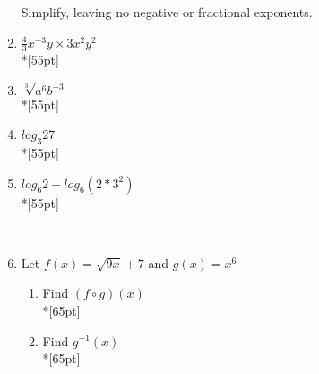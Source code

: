 \documentclass[]{book}
\begin{document}
\begin{enumerate}
\begin{figure}[!htbp]
\begin{center}
\begin{tikzpicture}[xscale= 0.2, yscale=0.015]
\end{tikzpicture}
\end{center}
\end{figure}

\newpage


Simplify, leaving no negative or fractional exponents.



\item $\frac{4}{3}x^{-3}y \times 3x^2 y^{2}$\\*[55pt]
\item $\sqrt[3]{a^6 b^{-3}}$\\*[55pt]
\item $log_3 27$\\*[55pt]
\item $log_6 2 + log_6 (2*3^2)$\\*[55pt]

\
\item Let $f(x) = \sqrt{9x} +7$ and $g(x)=x^6$
\begin{enumerate}
    \item Find $(f \circ g)(x)$\\*[65pt]
    \item Find $g^{-1}(x)$\\*[65pt]
\end{enumerate}


\end{enumerate}
\end{document}
